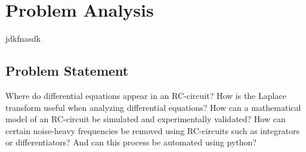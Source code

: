 \chapter{Problem Analysis}
jdkfnasdk

\section{Problem Statement}
Where do differential equations appear in an RC-circuit? How is the Laplace transform useful when analyzing differential equations? How can a mathematical model of an RC-circuit be simulated and experimentally validated? How can certain noise-heavy frequencies be removed using RC-circuits such as integrators or differentiators? And can this process be automated using python?
